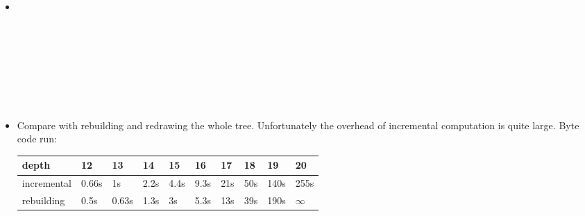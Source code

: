 \documentclass{beamer}
\begin{document}
\begin{itemize}
  \item {}{}{\hlopt{=}}{\hlendline{}}\\
  {\hlstd{ \ }}{}{}{\hlopt{<= }}{}{}{\hlopt{()}}{\hlendline{}}\\
  {\hlstd{ \ }}{}{}{\hlopt{(}}{}{\hlopt{)
  (}}{}{\hlopt{-}}{}{\hlopt{)}}{\hlendline{}}\\
  {}{}{\hlopt{() =}}{\hlendline{}}\\
  {\hlstd{ \ }}{}{}{}{}{\hlopt{;}}{\hlendline{}}\\
  {\hlstd{ \ }}{}{}{\hlopt{, }}{}{\hlopt{=
  }}{}{\hlopt{(}}{}{\hlopt{(}}{}{\hlopt{, }}{}{\hlopt{))
  }}{}{\hlendline{}}\\
  {\hlstd{ \ }}{}{}{\hlopt{= }}{}{\hlopt{>>=
  }}{}{\hlopt{(}}{}{\hlopt{(}}{}{}{}{}{}{}{}\\
  {}{\hlopt{[}}{}{\hlopt{, }}{}{\hlopt{,
  }}{}{\hlopt{] }}{}{\hlopt{;}}{}\\
  {\hlstd{ \
  }}{}{}{\hlstd{close{\textunderscore}graph
  }}{\hlopt{();;}}{\hlendline{}}
  
  \item Compare with rebuilding and redrawing the whole tree. Unfortunately
  the overhead of incremental computation is quite large. Byte code run:
  
  \begin{tabular}{|l|l|l|l|l|l|l|l|l|l|}
    \hline
    depth & 12 & 13 & 14 & 15 & 16 & 17 & 18 & 19 & 20\\
    \hline
    incremental & 0.66s & 1s & 2.2s & 4.4s & 9.3s & 21s & 50s & 140s & 255s\\
    \hline
    rebuilding & 0.5s & 0.63s & 1.3s & 3s & 5.3s & 13s & 39s & 190s &
    $\infty$\\
    \hline
  \end{tabular}
\end{itemize}
\end{document}
